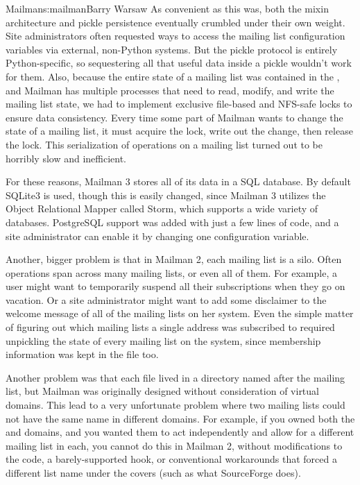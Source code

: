 \begin{aosachapter}{Mailman}{s:mailman}{Barry Warsaw}
As convenient as this was, both the mixin architecture and pickle persistence
eventually crumbled under their own weight.  Site administrators often
requested ways to access the mailing list configuration variables via
external, non-Python systems.  But the pickle protocol is entirely
Python-specific, so sequestering all that useful data inside a pickle wouldn't
work for them.  Also, because the entire state of a mailing list was contained
in the , and Mailman has multiple processes that need to read,
modify, and write the mailing list state, we had to implement exclusive
file-based and NFS-safe locks to ensure data consistency.  Every time some
part of Mailman wants to change the state of a mailing list, it must acquire
the lock, write out the change, then release the lock.  This serialization of
operations on a mailing list turned out to be horribly slow and inefficient.

For these reasons, Mailman 3 stores all of its data in a SQL database.  By
default SQLite3 is used, though this is easily changed, since Mailman 3
utilizes the Object Relational Mapper called Storm, which supports a wide
variety of databases.  PostgreSQL support was added with just a few lines of
code, and a site administrator can enable it by changing one configuration
variable.

Another, bigger problem is that in Mailman 2, each mailing list is a silo.
Often operations span across many mailing lists, or even all of them.  For
example, a user might want to temporarily suspend all their subscriptions when
they go on vacation.  Or a site administrator might want to add some
disclaimer to the welcome message of all of the mailing lists on her system.
Even the simple matter of figuring out which mailing lists a single address
was subscribed to required unpickling the state of every mailing list on the
system, since membership information was kept in the  file too.

Another problem was that each  file lived in a directory named
after the mailing list, but Mailman was originally designed without
consideration of virtual domains.  This lead to a very unfortunate problem
where two mailing lists could not have the same name in different domains.
For example, if you owned both the  and 
domains, and you wanted them to act independently and allow for a different
 mailing list in each, you cannot do this in Mailman 2, without
modifications to the code, a barely-supported hook, or conventional
workarounds that forced a different list name under the covers (such as what
SourceForge does).


\end{aosachapter}
